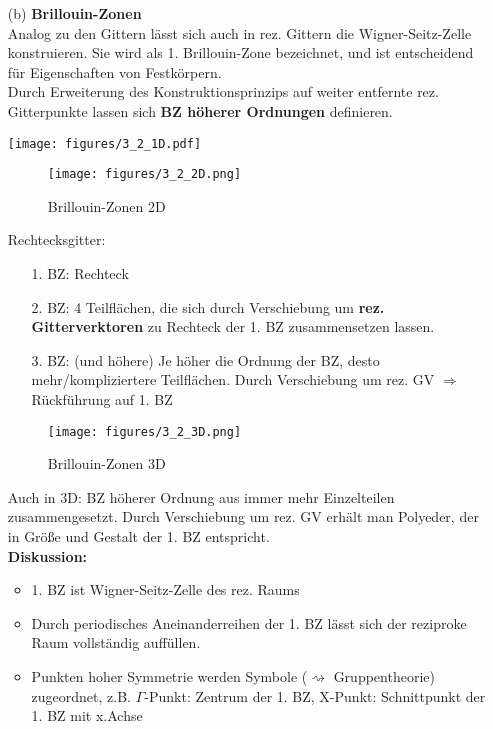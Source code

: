 \begin{itemize}
    \item[(b)] \textbf{Brillouin-Zonen}\\
          Analog zu den Gittern lässt sich auch in rez. Gittern die   Wigner-Seitz-Zelle konstruieren. Sie wird als 1. Brillouin-Zone bezeichnet, und ist entscheidend für Eigenschaften von Festkörpern.\\
          Durch Erweiterung des Konstruktionsprinzips auf weiter entfernte rez. Gitterpunkte lassen sich \textbf{BZ höherer Ordnungen} definieren.
          \begin{center}
              \texttt{[image: figures/3\_2\_1D.pdf]}
          \end{center}
          \begin{figure}[H]
              \centering
              \texttt{[image: figures/3\_2\_2D.png]}
              \caption{Brillouin-Zonen 2D}
              \label{}
          \end{figure}
          Rechtecksgitter:
          \begin{itemize}
              \item[1. BZ:] Rechteck
              \item[2. BZ:] 4 Teilflächen, die sich durch Verschiebung um \textbf{rez. Gitterverktoren} zu Rechteck der 1. BZ zusammensetzen lassen.
              \item[3. BZ:] (und höhere) Je höher die Ordnung der BZ, desto mehr/kompliziertere Teilflächen. Durch Verschiebung um rez. GV $\Rightarrow$ Rückführung auf 1. BZ
          \end{itemize}
          \begin{figure}[H]
              \centering
              \texttt{[image: figures/3\_2\_3D.png]}
              \caption{Brillouin-Zonen 3D}
              \label{}
          \end{figure}
          Auch in 3D: BZ höherer Ordnung aus immer mehr Einzelteilen zusammengesetzt. Durch Verschiebung um rez. GV erhält man Polyeder, der in Größe und Gestalt der 1. BZ entspricht.\\
          \textbf{Diskussion:}
          \begin{itemize}
              \item 1. BZ ist Wigner-Seitz-Zelle des rez. Raums
              \item Durch periodisches Aneinanderreihen der 1. BZ lässt sich der reziproke Raum vollständig auffüllen.
              \item Punkten hoher Symmetrie werden Symbole ($\rightsquigarrow$ Gruppentheorie) zugeordnet, z.B. $\Gamma$-Punkt: Zentrum der 1. BZ, X-Punkt: Schnittpunkt der 1. BZ mit x.Achse

\end{itemize}
\end{itemize}
